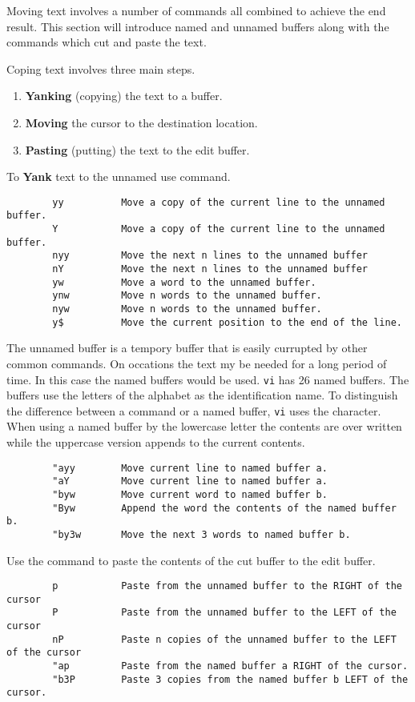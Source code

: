         Moving text involves a number of commands all combined to achieve
the end result. This section will introduce named and unnamed buffers along
with the commands which cut and paste the text.

Coping text involves three main steps.
\begin{enumerate}
\item {\bf Yanking} (copying) the text to a buffer.
\item {\bf Moving} the cursor to the destination location.
\item {\bf Pasting} (putting) the text to the edit buffer.
\end{enumerate}

To {\bf Yank} text to the unnamed use  command.
\begin{verbatim}
        yy          Move a copy of the current line to the unnamed buffer.
        Y           Move a copy of the current line to the unnamed buffer.
        nyy         Move the next n lines to the unnamed buffer
        nY          Move the next n lines to the unnamed buffer
        yw          Move a word to the unnamed buffer.
        ynw         Move n words to the unnamed buffer.
        nyw         Move n words to the unnamed buffer.
        y$          Move the current position to the end of the line.
\end{verbatim}

The unnamed buffer is a tempory buffer that is easily currupted by other
common commands. On occations the text my be needed for a long period
of time. In this case the named buffers would be used. {\tt vi} has 26
named buffers. The buffers use the letters of the alphabet as the
identification name. To distinguish the difference between a command
or a named buffer, {\tt vi} uses the  character. 
When using a named buffer by the lowercase letter the contents are over written while
the uppercase version appends to the current contents.
\begin{verbatim}
        "ayy        Move current line to named buffer a.
        "aY         Move current line to named buffer a.
        "byw        Move current word to named buffer b.
        "Byw        Append the word the contents of the named buffer b.
        "by3w       Move the next 3 words to named buffer b.
\end{verbatim}

Use the  command to paste the contents of the cut buffer to the
edit buffer.
\begin{verbatim}
        p           Paste from the unnamed buffer to the RIGHT of the cursor
        P           Paste from the unnamed buffer to the LEFT of the cursor
        nP          Paste n copies of the unnamed buffer to the LEFT of the cursor
        "ap         Paste from the named buffer a RIGHT of the cursor.
        "b3P        Paste 3 copies from the named buffer b LEFT of the cursor.
\end{verbatim}

